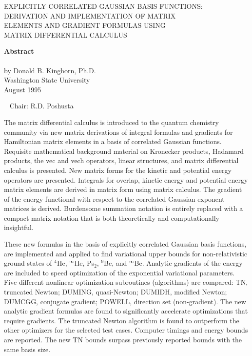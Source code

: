 \documentclass[12pt,thmsa]{article}
\begin{document}
\begin{center}
{EXPLICITLY CORRELATED GAUSSIAN BASIS FUNCTIONS:\\ DERIVATION AND
IMPLEMENTATION OF MATRIX \\ ELEMENTS AND GRADIENT FORMULAS USING \\ MATRIX
DIFFERENTIAL CALCULUS}

\textbf{Abstract} \\\ \\by Donald B. Kinghorn, Ph.D. \\Washington
State University \\August 1995
\end{center}

\ \newline
{\noindent Chair: R.D. Poshusta} \ \newline

The matrix differential calculus is introduced to the quantum chemistry
community via new matrix derivations of integral formulas and gradients for
Hamiltonian matrix elements in a basis of correlated Gaussian functions.
Requisite mathematical background material on Kronecker products, Hadamard
products, the vec and vech operators, linear structures, and matrix
differential calculus is presented. New matrix forms for the kinetic and
potential energy operators are presented. Integrals for overlap, kinetic
energy and potential energy matrix elements are derived in matrix form using
matrix calculus. The gradient of the energy functional with respect to the
correlated Gaussian exponent matrices is derived. Burdensome summation
notation is entirely replaced with a compact matrix notation that is both
theoretically and computationally insightful.

These new formulas in the basis of explicitly correlated Gaussian basis
functions, are implemented and applied to find variational upper bounds for
non-relativistic ground states of $^4$He, $^\infty $He, Ps$_2$, $^9$Be, and $%
^\infty $Be. Analytic gradients of the energy are included to speed
optimization of the exponential variational parameters. Five different
nonlinear optimization subroutines (algorithms) are compared: TN, truncated
Newton; DUMING, quasi-Newton; DUMIDH, modified Newton; DUMCGG, conjugate
gradient; POWELL, direction set (non-gradient). The new analytic gradient
formulas are found to significantly accelerate optimizations that require
gradients. The truncated Newton algorithm is found to outperform the other
optimizers for the selected test cases. Computer timings and energy bounds
are reported. The new TN bounds surpass previously reported bounds with the
same basis size.
\end{document}
